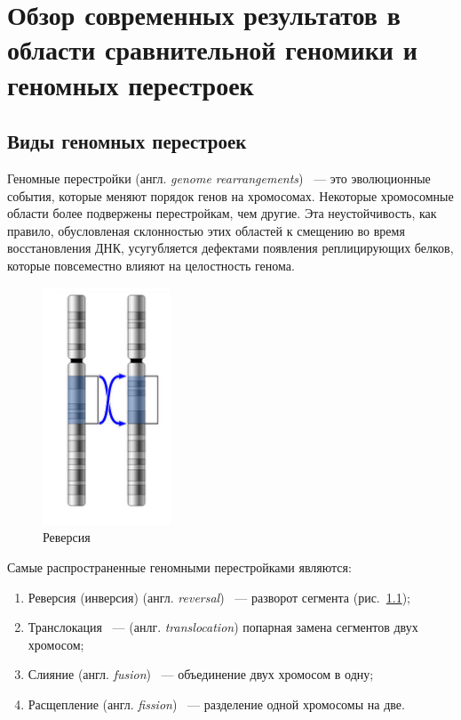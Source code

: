 \chapter{Обзор современных результатов в области сравнительной геномики и геномных перестроек}

\section{Виды геномных перестроек}

Геномные перестройки (англ. \textit{genome rearrangements}) ~--- это эволюционные события, которые меняют порядок генов на хромосомах.
Некоторые хромосомные области более подвержены перестройкам, чем другие.
Эта неустойчивость, как правило, обусловленая склонностью этих областей к смещению во время восстановления ДНК, усугубляется дефектами появления реплицирующих белков, которые повсеместно влияют на целостность генома.

\begin{figure}[h!]
    \includegraphics[width=1.5in]{img/reversal.png}
    \caption{Реверсия}
    \label{reversal}
\end{figure}

Самые распространенные геномными перестройками являются:
\begin{enumerate}
    \item Реверсия (инверсия) (англ. \textit{reversal}) ~--- разворот сегмента (рис.~\ref{reversal});
    \item Транслокация ~--- (анлг. \textit{translocation}) попарная замена сегментов двух хромосом;
    \item Слияние (англ. \textit{fusion}) ~--- объединение двух хромосом в одну;
    \item Расщепление (англ. \textit{fission}) ~--- разделение одной хромосомы на две.
\end{enumerate}

